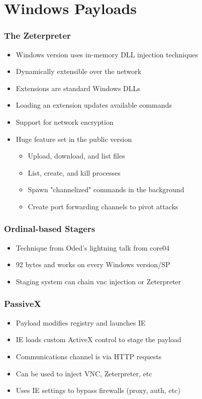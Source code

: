 \documentclass{beamer}
\newenvironment{sitemize}{\vspace{1mm}\begin{itemize}\itemsep 4pt}{\end{itemize}}
\begin{document}
\section{Windows Payloads}

\begin{frame}
	\frametitle{The Zeterpreter}
	\begin{sitemize}
		\item Windows version uses in-memory DLL injection techniques
		\item Dynamically extensible over the network
		\item Extensions are standard Windows DLLs
		\item Loading an extension updates available commands
		\item Support for network encryption
		\item Huge feature set in the public version
		\begin{sitemize}
			\item Upload, download, and list files
			\item List, create, and kill processes
			\item Spawn "channelized" commands in the background
			\item Create port forwarding channels to pivot attacks
		\end{sitemize}
	\end{sitemize}	
\end{frame}

\begin{frame}
	\frametitle{Ordinal-based Stagers}
	\begin{sitemize}
		\item Technique from Oded's lightning talk from core04
		\item 92 bytes and works on every Windows version/SP
		\item Staging system can chain vnc injection or Zeterpreter
	\end{sitemize}	
\end{frame}

\begin{frame}
	\frametitle{PassiveX}
	\begin{sitemize}
		\item Payload modifies registry and launches IE
		\item IE loads custom ActiveX control to stage the payload
		\item Communications channel is via HTTP requests
		\item Can be used to inject VNC, Zeterpreter, etc
		\item Uses IE settings to bypass firewalls (proxy, auth, etc)
	\end{sitemize}	
\end{frame}
\end{document}
